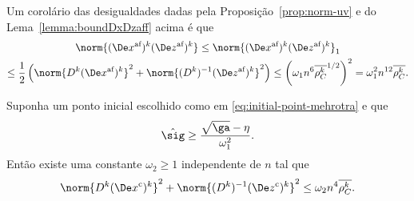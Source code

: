 Um corolário  das desigualdades dadas pela Proposição~\ref{prop:norm-uv} e do Lema~\ref{lemma:boundDxDzaff} acima é que 
\begin{multline}
\label{eq:normDxDzaff}
	\norm{ \dekx  \dekz  } \leq \norm{ \dekx  \dekz  }_{1}  \\ \leq \frac{1}{2}\left(\norm{\Dk \dekx}^{2} + \norm{\Dik  \dekz  }^{2}\right)
  					 \leq \left(\omega_1 n^6\dbvec{\rho_C^{k}}^{1/2}\right)^{2}
  					 = \omega_1^{2} n^{12}\dbvec{\rho_C^{k}}.
\end{multline}

\begin{lema}\label{lemma:boundDxDzc}
	Suponha um ponto inicial escolhido como em \eqref{eq:initial-point-mehrotra} e que \begin{equation}
	\label{eq:sig-eta-relation}
	\nextsig \geq \frac{\sqrt{\ga} - \eta}{\omega_1^{2}}.
\end{equation} Então existe uma constante $\omega_2\geq1$  independente de $n$ tal que 
	\begin{equation}\label{eq:lemma-boundDxDzcx}
		\norm{\Dk(\Decox)^{k}}^{2} + \norm{\Dik(\Decoz)^{k}}^{2} \leq \omega_2 n^{4}\dbvec{\rho_C^{k}}.
	\end{equation}
\end{lema}



